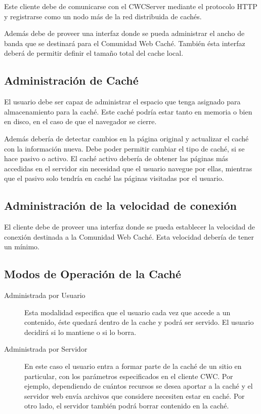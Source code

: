 Este cliente debe de comunicarse con el CWCServer mediante el protocolo HTTP y registrarse como un nodo más de la red distribuida de cachés.

Además debe de proveer una interfaz donde se pueda administrar el ancho de banda que se destinará para el Comunidad Web Caché. También ésta interfaz deberá de permitir definir el tamaño total del cache local.

\subsection{Administración de Caché}
El usuario debe ser capaz de administrar el espacio que tenga asignado para almacenamiento para la caché. Este caché podría estar tanto en memoria o bien en disco, en el caso de que el navegador se cierre.

Además debería de detectar cambios en la página original y actualizar el caché con la información nueva. 
Debe poder permitir cambiar el tipo de caché, si se hace pasivo o activo. El caché activo debería de obtener las páginas más accedidas en el servidor sin necesidad que el usuario navegue por ellas, mientras que el pasivo solo tendría en caché las páginas visitadas por el usuario.

\subsection{Administración de la velocidad de conexión}
El cliente debe de proveer una interfaz donde se pueda establecer la velocidad de conexión destinada a la Comunidad Web Caché. Esta velocidad debería de tener un mínimo.

\subsection{Modos de Operación de la Caché}
\begin{description}
\item[Administrada por Usuario] Esta modalidad especifica que el usuario cada vez que accede a un contenido, éste quedará dentro de la cache y podrá ser servido. El usuario decidirá si lo mantiene o si lo borra.

\item[Administrada por Servidor] En este caso el usuario entra a formar parte de la caché de un sitio en particular, con los parámetros especificados en el cliente CWC. Por ejemplo, dependiendo de cuántos recursos se desea aportar a la caché y el servidor web envía archivos que considere necesiten estar en caché. Por otro lado, el servidor también podrá borrar contenido en la caché.

\end{description}
